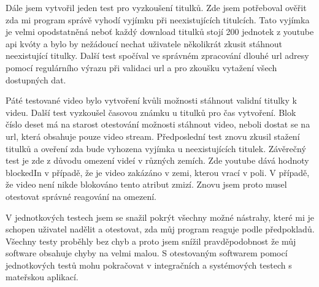 \par Dále jsem vytvořil jeden test pro vyzkoušení titulků. Zde jsem potřeboval ověřit zda mi program správě vyhodí vyjímku při neexistujících titulcích. Tato vyjímka je velmi opodstatněná neboť každý download titulků stojí 200 jednotek z youtube api kvóty a bylo by nežádoucí nechat uživatele několikrát zkusit stáhnout neexistující titulky. Další test spočíval ve správném zpracování dlouhé url adresy pomocí regulárního výrazu při validaci url a pro zkoušku vytažení všech dostupných dat.
\par Páté testované video bylo vytvoření kvůli možnosti stáhnout validní titulky k videu. Další test vyzkoušel časovou známku u titulků pro čas vytvoření. Blok číslo deset má na starost otestování možnosti stáhnout video, neboli dostat se na url, která obsahuje pouze video stream. Předposlední test znovu zkusil stažení titulků a oveření zda bude vyhozena vyjímka u neexistujících titulek. Závěrečný test je zde z důvodu omezení videí v různých zemích. Zde youtube dává hodnoty blockedIn v případě, že je video zakázáno v zemi, kterou vrací v poli. V případě, že video není nikde blokováno tento atribut zmizí. Znovu jsem proto musel otestovat správné reagování na omezení.
\par V jednotkových testech jsem se snažil pokrýt všechny možné nástrahy, které mi je schopen uživatel nadělit a otestovat, zda můj program reaguje podle předpokladů. Všechny testy proběhly bez chyb a proto jsem snížil pravděpodobnost že můj software obsahuje chyby na velmi malou. S otestovaným softwarem pomocí jednotkových testů mohu pokračovat v integračních a systémových testech s mateřskou aplikací.
